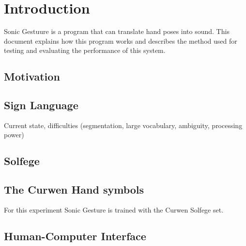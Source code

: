 
\chapter{Introduction}
\label{ch:intro}

Sonic Gestuure is a program that can translate hand poses into sound. This
document explains how this program works and describes the method used for
testing and evaluating the performance of this system.

\section{Motivation}

\section{Sign Language}
Current state, difficulties (segmentation, large vocabulary, ambiguity, processing power)

\section{Solfege}


\section{The Curwen Hand symbols}
For this experiment Sonic Gesture is trained with the Curwen Solfege set\cite{choksy1999}.

\section{Human-Computer Interface}
